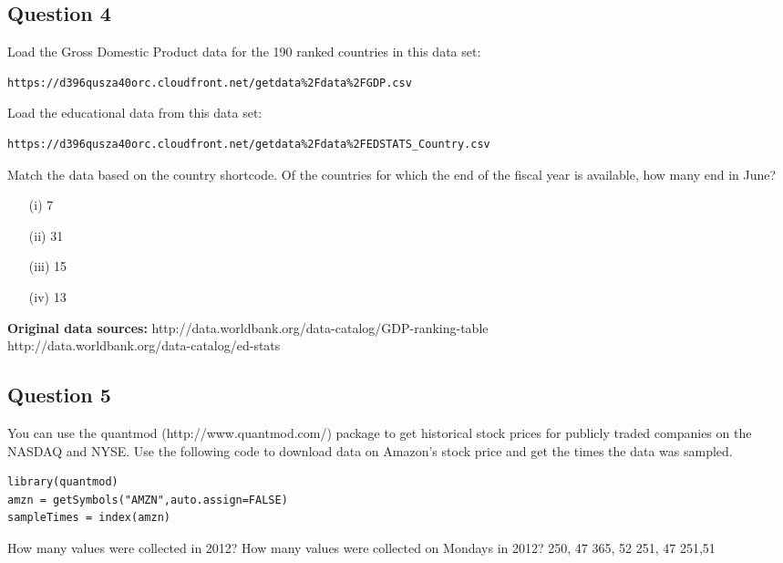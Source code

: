 \documentclass[]{article}
\begin{document}
\subsection*{Question 4}
Load the Gross Domestic Product data for the 190 ranked countries in this data set: 

\begin{verbatim}
https://d396qusza40orc.cloudfront.net/getdata%2Fdata%2FGDP.csv 
\end{verbatim}
Load the educational data from this data set: 

\begin{verbatim}
https://d396qusza40orc.cloudfront.net/getdata%2Fdata%2FEDSTATS_Country.csv 
\end{verbatim}
Match the data based on the country shortcode. Of the countries for which the end of the fiscal year is available, how many end in June? 

\begin{itemize}
\item[(i)] 7
\item[(ii)] 31
\item[(iii)] 15
\item[(iv)] 13
\end{itemize}

\textbf{Original data sources: }
http://data.worldbank.org/data-catalog/GDP-ranking-table \\
http://data.worldbank.org/data-catalog/ed-stats \\
\subsection*{Question 5}
You can use the quantmod (http://www.quantmod.com/) package to get historical stock prices for publicly traded companies on the NASDAQ and NYSE. Use the following code to download data on Amazon's stock price and get the times the data was sampled.
\begin{framed}
\begin{verbatim}
library(quantmod)
amzn = getSymbols("AMZN",auto.assign=FALSE)
sampleTimes = index(amzn) 
\end{verbatim}
\end{framed}
How many values were collected in 2012? How many values were collected on Mondays in 2012?
250, 47
365, 52
251, 47
251,51
\end{document}
